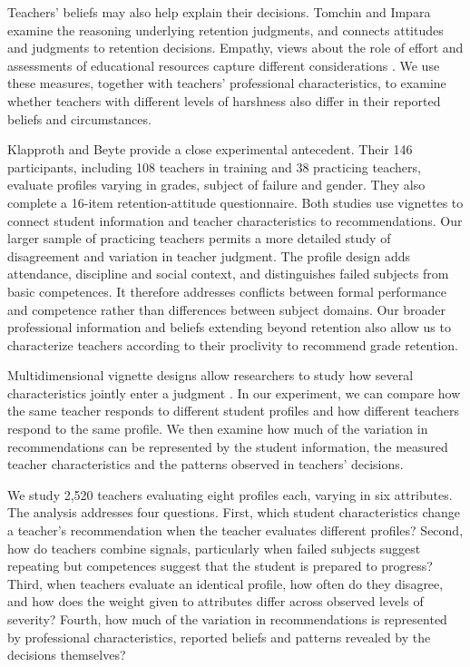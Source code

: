 Teachers' beliefs may also help explain their decisions. Tomchin and Impara \citeyearpar{tomchin} examine the reasoning underlying retention judgments, and \citet{bonvin} connects attitudes and judgments to retention decisions. Empathy, views about the role of effort and assessments of educational resources capture different considerations \citep{pajares}. We use these measures, together with teachers' professional characteristics, to examine whether teachers with different levels of harshness also differ in their reported beliefs and circumstances.

Klapproth and Beyte \citeyearpar{klapproth} provide a close experimental antecedent. Their 146 participants, including 108 teachers in training and 38 practicing teachers, evaluate profiles varying in grades, subject of failure and gender. They also complete a 16-item retention-attitude questionnaire. Both studies use vignettes to connect student information and teacher characteristics to recommendations. Our larger sample of practicing teachers permits a more detailed study of disagreement and variation in teacher judgment. The profile design adds attendance, discipline and social context, and distinguishes failed subjects from basic competences. It therefore addresses conflicts between formal performance and competence rather than differences between subject domains. Our broader professional information and beliefs extending beyond retention also allow us to characterize teachers according to their proclivity to recommend grade retention.

Multidimensional vignette designs allow researchers to study how several characteristics jointly enter a judgment \citep{conjoint,hainmueller2015}. In our experiment, we can compare how the same teacher responds to different student profiles and how different teachers respond to the same profile. We then examine how much of the variation in recommendations can be represented by the student information, the measured teacher characteristics and the patterns observed in teachers' decisions.

We study 2,520 teachers evaluating eight profiles each, varying in six attributes. The analysis addresses four questions. First, which student characteristics change a teacher's recommendation when the teacher evaluates different profiles? Second, how do teachers combine signals, particularly when failed subjects suggest repeating but competences suggest that the student is prepared to progress? Third, when teachers evaluate an identical profile, how often do they disagree, and how does the weight given to attributes differ across observed levels of severity? Fourth, how much of the variation in recommendations is represented by professional characteristics, reported beliefs and patterns revealed by the decisions themselves?


